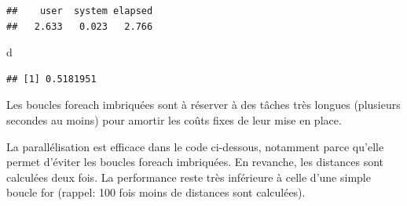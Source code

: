 \documentclass[
  12pt,
  french,
  a4paper,
  extrafontsizes,onecolumn,openright
  ]{memoir}
\newenvironment{Shaded}{\begin{snugshade}}{\end{snugshade}}
\newcommand{\ControlFlowTok}[1]{\textcolor[rgb]{0.13,0.29,0.53}{\textbf{#1}}}
\newcommand{\DataTypeTok}[1]{\textcolor[rgb]{0.13,0.29,0.53}{#1}}
\newcommand{\DecValTok}[1]{\textcolor[rgb]{0.00,0.00,0.81}{#1}}
\newcommand{\KeywordTok}[1]{\textcolor[rgb]{0.13,0.29,0.53}{\textbf{#1}}}
\newcommand{\NormalTok}[1]{#1}
\newcommand{\OperatorTok}[1]{\textcolor[rgb]{0.81,0.36,0.00}{\textbf{#1}}}
\newcommand{\StringTok}[1]{\textcolor[rgb]{0.31,0.60,0.02}{#1}}
\newlength{\rf}
\begin{document}
\begin{verbatim}
##    user  system elapsed 
##   2.633   0.023   2.766
\end{verbatim}

\begin{Shaded}
\begin{Highlighting}[]
\NormalTok{d}
\end{Highlighting}
\end{Shaded}

\begin{verbatim}
## [1] 0.5181951
\end{verbatim}

\normalsize

Les boucles foreach imbriquées sont à réserver à des tâches très longues (plusieurs secondes au moins) pour amortir les coûts fixes de leur mise en place.

La parallélisation est efficace dans le code ci-dessous, notamment parce qu'elle permet d'éviter les boucles foreach imbriquées.
En revanche, les distances sont calculées deux fois.
La performance reste très inférieure à celle d'une simple boucle for (rappel: 100 fois moins de distances sont calculées).

\scriptsize

\begin{Shaded}
\end{Shaded}
\end{document}
